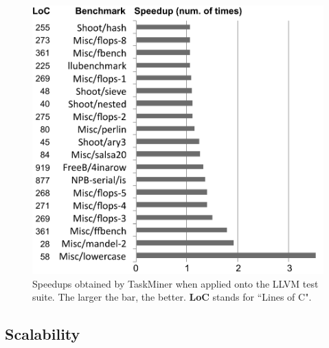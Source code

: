 \documentclass[sigplan,10pt,review,anonymous]{acmart}
\newcommand\Taskminer{\mbox{\textsf{TaskMiner}}}
\begin{document}
\begin{figure}[htb]
\begin{center}
\includegraphics[width=1\columnwidth]{images/TM_GeneralProgs}
\caption{Speedups obtained by \Taskminer{} when applied onto the LLVM
test suite.
The larger the bar, the better.
\textbf{LoC} stands for ``Lines of C".}
\label{fig:TM_GeneralProgs}
\end{center}
\end{figure}



\subsection{Scalability}
\label{sub:scalability}
\end{document}
